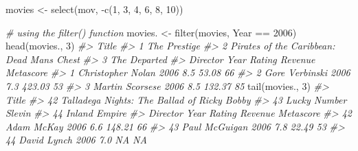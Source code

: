 \documentclass[
]{book}
\newenvironment{Shaded}{\begin{snugshade}}{\end{snugshade}}
\newcommand{\CommentTok}[1]{\textcolor[rgb]{0.56,0.35,0.01}{\textit{#1}}}
\newcommand{\DecValTok}[1]{\textcolor[rgb]{0.00,0.00,0.81}{#1}}
\newcommand{\FunctionTok}[1]{\textcolor[rgb]{0.00,0.00,0.00}{#1}}
\newcommand{\NormalTok}[1]{#1}
\newcommand{\OtherTok}[1]{\textcolor[rgb]{0.56,0.35,0.01}{#1}}
\newcommand{\SpecialCharTok}[1]{\textcolor[rgb]{0.00,0.00,0.00}{#1}}
\begin{document}
\begin{Shaded}
\begin{Highlighting}[]
\NormalTok{movies }\OtherTok{\textless{}{-}} \FunctionTok{select}\NormalTok{(mov, }\SpecialCharTok{{-}}\FunctionTok{c}\NormalTok{(}\DecValTok{1}\NormalTok{, }\DecValTok{3}\NormalTok{, }\DecValTok{4}\NormalTok{, }\DecValTok{6}\NormalTok{, }\DecValTok{8}\NormalTok{, }\DecValTok{10}\NormalTok{))}

\CommentTok{\# using the filter() function}
\NormalTok{movies. }\OtherTok{\textless{}{-}} \FunctionTok{filter}\NormalTok{(movies, Year }\SpecialCharTok{==} \DecValTok{2006}\NormalTok{)}
\FunctionTok{head}\NormalTok{(movies., }\DecValTok{3}\NormalTok{)}
\CommentTok{\#\textgreater{}                                        Title}
\CommentTok{\#\textgreater{} 1                               The Prestige}
\CommentTok{\#\textgreater{} 2 Pirates of the Caribbean: Dead Man\textquotesingle{}s Chest}
\CommentTok{\#\textgreater{} 3                               The Departed}
\CommentTok{\#\textgreater{}            Director Year Rating Revenue Metascore}
\CommentTok{\#\textgreater{} 1 Christopher Nolan 2006    8.5   53.08        66}
\CommentTok{\#\textgreater{} 2    Gore Verbinski 2006    7.3  423.03        53}
\CommentTok{\#\textgreater{} 3   Martin Scorsese 2006    8.5  132.37        85}
\FunctionTok{tail}\NormalTok{(movies., }\DecValTok{3}\NormalTok{)}
\CommentTok{\#\textgreater{}                                          Title}
\CommentTok{\#\textgreater{} 42 Talladega Nights: The Ballad of Ricky Bobby}
\CommentTok{\#\textgreater{} 43                         Lucky Number Slevin}
\CommentTok{\#\textgreater{} 44                               Inland Empire}
\CommentTok{\#\textgreater{}         Director Year Rating Revenue Metascore}
\CommentTok{\#\textgreater{} 42    Adam McKay 2006    6.6  148.21        66}
\CommentTok{\#\textgreater{} 43 Paul McGuigan 2006    7.8   22.49        53}
\CommentTok{\#\textgreater{} 44   David Lynch 2006    7.0      NA        NA}


\end{Highlighting}
\end{Shaded}
\end{document}
